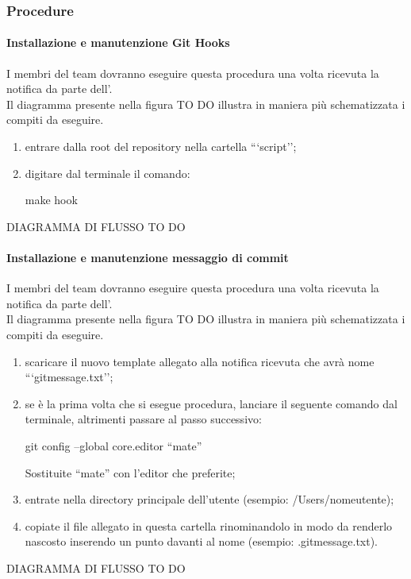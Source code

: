 			
		\subsubsection{Procedure}
			\paragraph{Installazione e manutenzione Git Hooks} \label{sec:installazione_git_hooks}
			I membri del team dovranno eseguire questa procedura una volta ricevuta la notifica da parte dell'\roleAdministrator. \\
			Il diagramma presente nella figura TO DO illustra in maniera più schematizzata i compiti da eseguire.
				\begin{enumerate}
					\item entrare dalla root del repository nella cartella ```script'';
					\item digitare dal terminale il comando:
						\begin{center}
							make hook
						\end{center}
				\end{enumerate}
			DIAGRAMMA DI FLUSSO TO DO
			
			\paragraph{Installazione e manutenzione messaggio di commit}
			I membri del team dovranno eseguire questa procedura una volta ricevuta la notifica da parte dell'\roleAdministrator. \\
			Il diagramma presente nella figura TO DO illustra in maniera più schematizzata i compiti da eseguire.
				\begin{enumerate}
					\item scaricare il nuovo template allegato alla notifica ricevuta che avrà nome ```gitmessage.txt'';
					\item se è la prima volta che si esegue procedura, lanciare il seguente comando dal terminale, altrimenti passare al passo successivo:
						\begin{center}
							git config --global core.editor ``mate''
						\end{center}
					\noindent
					Sostituite ``mate'' con l'editor che preferite;
					\item entrate nella directory principale dell'utente (esempio: /Users/nomeutente);
					\item copiate il file allegato in questa cartella rinominandolo in modo da renderlo nascosto inserendo un punto davanti al nome (esempio: .gitmessage.txt).
				\end{enumerate}
			DIAGRAMMA DI FLUSSO TO DO
			
